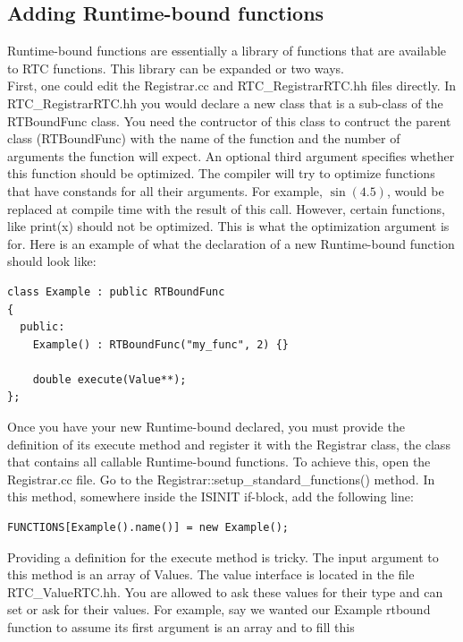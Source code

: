 \documentclass{article}
\begin{document}



\subsection{Adding Runtime-bound functions}

Runtime-bound functions are essentially a library of functions that are 
available to RTC functions. This library can be expanded or two ways. \\

\noindent
First, one could edit the Registrar.cc and RTC\_RegistrarRTC.hh files
directly. In RTC\_RegistrarRTC.hh you would declare a new class that is a 
sub-class of the RTBoundFunc class. You need the contructor of this class
to contruct the parent class (RTBoundFunc) with the name of the function
and the number of arguments the function will expect. An optional third
argument specifies whether this function should be optimized. The compiler
will try to optimize functions that have constands for all their arguments.
For example, $\sin(4.5)$, would be replaced at compile time with the result 
of this call. However, certain functions, like print(x) should not be
optimized. This is what the optimization argument is for. Here is an example
of what the declaration of a new Runtime-bound function should look like:
{\ttfamily \begin{verbatim}
class Example : public RTBoundFunc
{
  public:
    Example() : RTBoundFunc("my_func", 2) {}
 
    double execute(Value**);
};
\end{verbatim} }
\noindent
Once you have your new Runtime-bound declared, you must provide the definition
of its execute method and register it with the Registrar class, the class that
contains all callable Runtime-bound functions. To achieve this, open the 
Registrar.cc file. Go to the Registrar::setup\_standard\_functions() method.
In this method, somewhere inside the ISINIT if-block, add the following
line:
{\ttfamily \begin{verbatim}
FUNCTIONS[Example().name()] = new Example();
\end{verbatim} }
\noindent
Providing a definition for the execute method is tricky. The input argument
to this method is an array of Values. The value interface is located in
the file RTC\_ValueRTC.hh. You are allowed to ask these values for their type
and can set or ask for their values. For example, say we wanted our Example
rtbound function to assume its first argument is an array and to fill this
\end{document}
